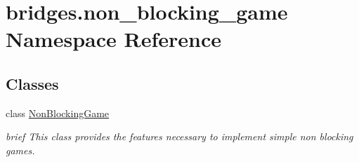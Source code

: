 \hypertarget{namespacebridges_1_1non__blocking__game}{}\section{bridges.\+non\+\_\+blocking\+\_\+game Namespace Reference}
\label{namespacebridges_1_1non__blocking__game}
\subsection*{Classes}
\begin{DoxyCompactItemize}
\item 
class \mbox{\hyperlink{classbridges_1_1non__blocking__game_1_1_non_blocking_game}{Non\+Blocking\+Game}}
\begin{DoxyCompactList}\small\item\em brief This class provides the features necessary to implement simple non blocking games. \end{DoxyCompactList}\end{DoxyCompactItemize}
